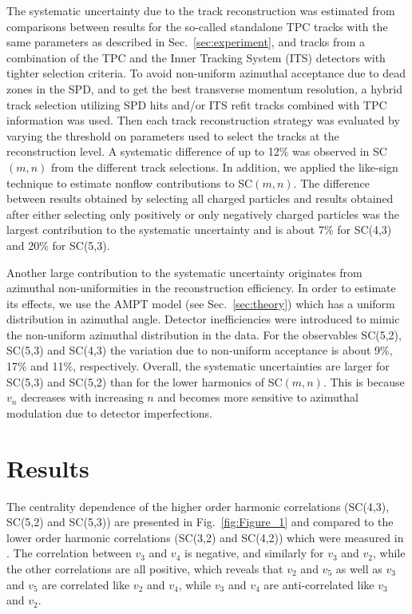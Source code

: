 The systematic uncertainty due to the track reconstruction was estimated from comparisons between results for the so-called standalone TPC tracks with the 
same parameters as described in Sec.~\ref{sec:experiment}, and tracks from a combination of the TPC and the Inner Tracking System (ITS) detectors with tighter selection criteria.
To avoid non-uniform azimuthal acceptance due to dead zones in the SPD, and to get the best transverse momentum resolution, a hybrid track selection utilizing SPD hits and/or ITS refit tracks combined with TPC information was used.
Then each track reconstruction strategy was evaluated by varying the threshold on parameters used to select the tracks at the reconstruction level. 
A systematic difference of up to 12\% was observed in SC$(m,n)$ from the different track selections. 
In addition, we applied the like-sign technique to estimate nonflow contributions to SC$(m,n)$. The difference between results obtained by selecting all charged particles and results obtained after either selecting only positively or only negatively charged particles was the largest contribution to the systematic uncertainty and is about 7\% for SC(4,3) and 20\% for SC(5,3). 

Another large contribution to the systematic uncertainty originates from azimuthal non-uniformities in the reconstruction efficiency. In order to estimate its effects, we use the AMPT model (see Sec.~\ref{sec:theory}) which has a uniform distribution in azimuthal angle.
Detector inefficiencies were introduced to mimic the non-uniform azimuthal distribution in the data. For the observables SC(5,2), SC(5,3) and SC(4,3) the variation due to non-uniform acceptance is about 9\%, 17\% and 11\%, respectively.
Overall, the systematic uncertainties are larger for SC(5,3) and SC(5,2) than for the lower harmonics of SC$(m,n)$.
This is because $v_{n}$ decreases with increasing $n$ and becomes more sensitive to azimuthal modulation due to detector imperfections. 

\section{Results}
\label{sec:results}
The centrality dependence of the higher order harmonic correlations (SC(4,3), SC(5,2) and SC(5,3)) are presented in Fig.~\ref{fig:Figure_1} and compared to the lower order harmonic correlations (SC(3,2) and SC(4,2)) which were measured in \cite{ALICE:2016kpq}. The correlation between $v_3$ and $v_4$ is negative, and similarly for $v_3$ and $v_2$, while the other correlations are all positive, which reveals that $v_2$ and $v_5$ as well as $v_3$ and $v_5$ are correlated like $v_2$ and $v_4$, while $v_3$ and $v_4$ are anti-correlated like $v_3$ and $v_2$.

